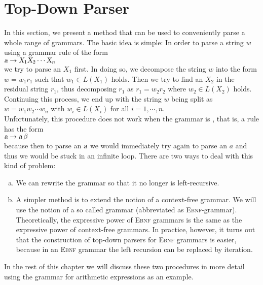 \section{Top-Down Parser}
In this section, we present a method that can be used to conveniently parse a whole range of
grammars.  The basic idea is simple: In order to parse a string $w$ using
a grammar rule of the form
\\[0.2cm]
\hspace*{1.3cm}
$\textsl{a} \rightarrow \textsl{X}_1 \textsl{X}_2 \cdots \textsl{X}_n$
\\[0.2cm]
we try to parse an $X_1$ first.  In doing so, we decompose the string $w$ into the
form
$w = w_1 r_1$ such that $w_1 \in L(X_1)$ holds.  Then we try to find an $X_2$ in the residual string
$r_1$, thus decomposing $r_1$ as $r_1 = w_2 r_2$ where
$w_2 \in L(X_2)$ holds.  Continuing this process, we end up with the string $w$ being split as
\\[0.2cm]
\hspace*{1.3cm}
$w = w_1 w_2 \cdots w_n$ \quad with $w_i \in L(X_i)$ for all $i=1,\cdots,n$.
\\[0.2cm]
Unfortunately, this procedure does not work when the grammar is
, that is, a rule has the form
\\[0.2cm]
\hspace*{1.3cm}
$\textsl{a} \rightarrow \textsl{a}\, \beta$
\\[0.2cm]
because then to parse an $\textsl{a}$ we would immediately try again to parse an $a$ and thus we would be stuck in an infinite loop.
There are two ways to deal with this kind of problem:
\begin{enumerate}[(a)]
\item We can rewrite the grammar so that it no longer is left-recursive.
\item A simpler method is to extend the notion of a context-free grammar.
      We will use the notion of a so called  grammar
      (abbreviated as \textsc{Ebnf}-grammar).   Theoretically, the expressive power of
      \textsc{Ebnf} grammars is the same as the expressive power of context-free grammars.
      In practice, however, it turns out that the construction of top-down parsers for
      \textsc{Ebnf} grammars is easier, because in an \textsc{Ebnf} grammar the left recursion can be replaced
      by iteration. 
\end{enumerate}
In the rest of this chapter we will discuss these two procedures in more detail using the grammar for
arithmetic expressions as an example.  


